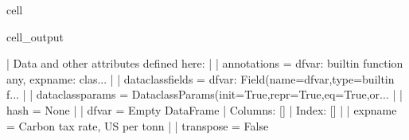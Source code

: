 \documentclass[letterpaper,10pt,english]{jupyterBook}
\begin{document}
\begin{sphinxuseclass}{cell}
\begin{sphinxVerbatimOutput}
\begin{sphinxuseclass}{cell_output}
\begin{sphinxVerbatim}[commandchars=\\\{\}]
     |  Data and other attributes defined here:
     |  
     |  \PYGZus{}\PYGZus{}annotations\PYGZus{}\PYGZus{} = \PYGZob{}\PYGZsq{}df\PYGZus{}var\PYGZsq{}: \PYGZlt{}built\PYGZhy{}in function any\PYGZgt{}, \PYGZsq{}expname\PYGZsq{}: \PYGZlt{}clas...
     |  
     |  \PYGZus{}\PYGZus{}dataclass\PYGZus{}fields\PYGZus{}\PYGZus{} = \PYGZob{}\PYGZsq{}df\PYGZus{}var\PYGZsq{}: Field(name=\PYGZsq{}df\PYGZus{}var\PYGZsq{},type=\PYGZlt{}built\PYGZhy{}in f...
     |  
     |  \PYGZus{}\PYGZus{}dataclass\PYGZus{}params\PYGZus{}\PYGZus{} = \PYGZus{}DataclassParams(init=True,repr=True,eq=True,or...
     |  
     |  \PYGZus{}\PYGZus{}hash\PYGZus{}\PYGZus{} = None
     |  
     |  df\PYGZus{}var = Empty DataFrame
     |  Columns: []
     |  Index: []
     |  
     |  expname = \PYGZsq{}Carbon tax rate, US\PYGZdl{} per tonn \PYGZsq{}
     |  
     |  transpose = False
    

\end{sphinxVerbatim}
\end{sphinxuseclass}
\end{sphinxVerbatimOutput}
\end{sphinxuseclass}
\end{document}
